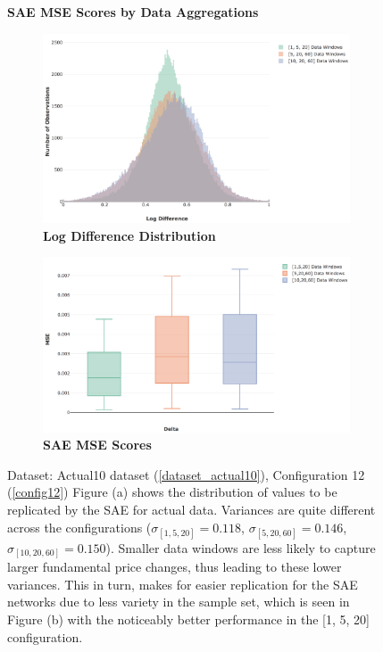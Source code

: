 \documentclass[a4paper,11pt,oneside]{article}
\theoremstyle{plain}
\theoremstyle{definition}
\begin{document}
	
	\begin{figure}[H]
		\centering
		\textbf{SAE MSE Scores by Data Aggregations}
		\begin{subfigure}{.44\textwidth}
			\centering 
			\includegraphics[scale=0.29]{images/results/data/actual_aggregate_dist.png}
			\caption{\textbf{Log Difference Distribution}
				\newline }
			\label{figure-actual_aggregate_dist}
		\end{subfigure}%
		\begin{subfigure}{.5\textwidth}
			\centering 
			\includegraphics[scale=0.3]{images/results/data/actual_aggregation_mse.png}
			\caption{\textbf{SAE MSE Scores} 
				\newline }
			\label{figure-actual_aggregation_mse}
		\end{subfigure}
		\caption[SAE MSE Scores by Data Aggregations]
		{Dataset: Actual10 dataset (\ref{dataset_actual10}), Configuration 12 (\ref{config12})
			\newline Figure (a) shows the distribution of values to be replicated by the SAE for actual data. Variances are quite different across the configurations ($\sigma_{[1,5,20]} = 0.118$, $\sigma_{[5,20,60]} = 0.146$, $\sigma_{[10,20,60]} = 0.150$). Smaller data windows are less likely to capture larger fundamental price changes, thus leading to these lower variances. This in turn, makes for easier replication for the SAE networks due to less variety in the sample set, which is seen in Figure (b) with the noticeably better performance in the [1, 5, 20] configuration.}
		\label{fig_data_sae_actual}
	\end{figure}
	
\end{document}
